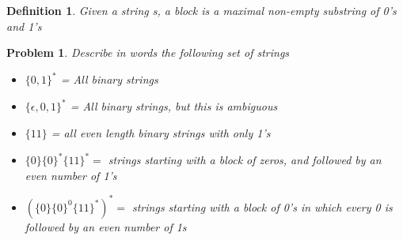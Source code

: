 \documentclass{article}
\newtheorem{expx}[theorem]{Problem}
\newtheorem{definition}[theorem]{Definition}
\begin{document}
\begin{definition}
Given a string s, a block is a maximal non-empty substring of 0's and 1's  
\end{definition}

\begin{expx}
Describe in words the following set of strings
\begin{itemize}
\item \(\{0,1\}^*\) = All binary strings
\item \(\{\epsilon, 0, 1\}^*\) = All binary strings, but this is ambiguous
\item \(\{11\}\) = all even length binary strings with only 1's
\item \(\{0\}\{0\}^*\{11\}^* = \) strings starting with a block of zeros, and followed by an even number of 1's
\item \(\left(\{0\}\{0\}^0\{11\}^*\right)^* =\) strings starting with a block of 0's in which every 0 is followed by an even number of 1s 
\end{itemize} 
\end{expx}
\end{document}
